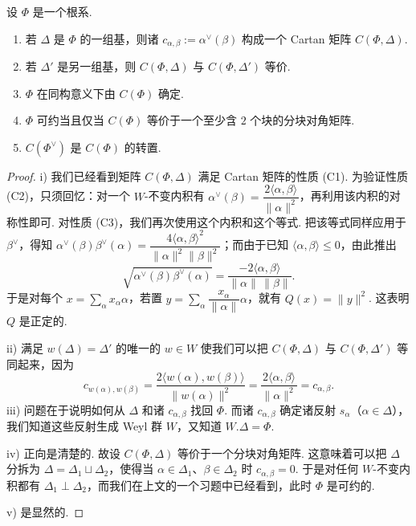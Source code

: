 \begin{lemma*}
设 $\Phi$ 是一个根系.
\begin{enumerate}[label=\roman*)]
\item 若 $\Delta$ 是 $\Phi$ 的一组基，则诸 $c_{\alpha,\beta}:=\alpha^{\vee}(\beta)$ 构成一个 Cartan 矩阵 $C(\Phi,\Delta)$.
\item 若 $\Delta'$ 是另一组基，则 $C(\Phi,\Delta)$ 与 $C(\Phi,\Delta')$ 等价.
\item $\Phi$ 在同构意义下由 $C(\Phi)$ 确定.
\item $\Phi$ 可约当且仅当 $C(\Phi)$ 等价于一个至少含 $2$ 个块的分块对角矩阵.
\item $C(\Phi^{\vee})$ 是 $C(\Phi)$ 的转置.
\end{enumerate}
\end{lemma*}
\begin{proof}
i) 我们已经看到矩阵 $C(\Phi,\Delta)$ 满足 Cartan 矩阵的性质 (C1). 为验证性质 (C2)，只须回忆：对一个 $W$-不变内积有 $\alpha^{\vee}(\beta)=\dfrac{2\langle\alpha,\beta\rangle}{\lVert\alpha\rVert^{2}}$，再利用该内积的对称性即可. 对性质 (C3)，我们再次使用这个内积和这个等式. 把该等式同样应用于 $\beta^{\vee}$，得知 $\alpha^{\vee}(\beta)\beta^{\vee}(\alpha)=\dfrac{4\langle\alpha,\beta\rangle^{2}}{\lVert\alpha\rVert^{2}\lVert\beta\rVert^{2}}$；而由于已知 $\langle\alpha,\beta\rangle\leqslant 0$，由此推出
\[\sqrt{\alpha^{\vee}(\beta)\beta^{\vee}(\alpha)}=\frac{-2\langle\alpha,\beta\rangle}{\lVert\alpha\rVert\,\lVert\beta\rVert}.\]
于是对每个 $x=\sum_{\alpha}x_{\alpha}\alpha$，若置 $y=\sum_{\alpha}\dfrac{x_{\alpha}}{\lVert\alpha\rVert}\alpha$，就有 $Q(x)=\lVert y\rVert^{2}$. 这表明 $Q$ 是正定的.

ii) 满足 $w(\Delta)=\Delta'$ 的唯一的 $w\in W$ 使我们可以把 $C(\Phi,\Delta)$ 与 $C(\Phi,\Delta')$ 等同起来，因为
\[c_{w(\alpha),w(\beta)}=\frac{2\langle w(\alpha),w(\beta)\rangle}{\lVert w(\alpha)\rVert^{2}}=\frac{2\langle\alpha,\beta\rangle}{\lVert\alpha\rVert^{2}}=c_{\alpha,\beta}.\]
iii) 问题在于说明如何从 $\Delta$ 和诸 $c_{\alpha,\beta}$ 找回 $\Phi$. 而诸 $c_{\alpha,\beta}$ 确定诸反射 $s_{\alpha}$（$\alpha\in\Delta$），我们知道这些反射生成 Weyl 群 $W$，又知道 $W.\Delta=\Phi$.

iv) 正向是清楚的. 故设 $C(\Phi,\Delta)$ 等价于一个分块对角矩阵. 这意味着可以把 $\Delta$ 分拆为 $\Delta=\Delta_1\sqcup\Delta_2$，使得当 $\alpha\in\Delta_1$、$\beta\in\Delta_2$ 时 $c_{\alpha,\beta}=0$. 于是对任何 $W$-不变内积都有 $\Delta_1\perp\Delta_2$，而我们在上文的一个习题中已经看到，此时 $\Phi$ 是可约的.

v) 是显然的.
\end{proof}

